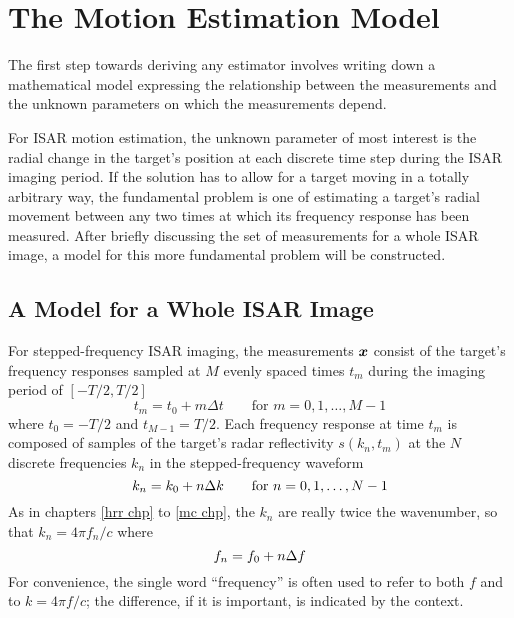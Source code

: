 \section{The Motion Estimation Model}

The first step towards deriving any estimator involves writing down a
mathematical model expressing the relationship between the measurements and 
the unknown parameters on which the measurements depend.  

For ISAR motion estimation, the unknown parameter of most interest is the
radial change in the target's position at each discrete time step during
the ISAR imaging period.  If the solution has to allow for a target moving in a
totally arbitrary way, the fundamental problem is one of estimating a
target's radial movement between any two times at which its frequency 
response has been measured.  After briefly discussing the set of
measurements for a whole ISAR image, a model for this more fundamental
problem will be constructed.

\subsection{A Model for a Whole ISAR Image}

For stepped-frequency ISAR imaging, the measurements $\bm{x}$ consist of the
target's frequency responses sampled at $M$ evenly spaced times $t_m$
during the imaging period of $[-T/2,T/2]$
\begin{equation}
t_m=t_0+m\Delta t\qquad\mbox{for $m=0,1,\ldots,M-1$}
\end{equation}
where $t_0=-T/2$ and $t_{M-1}=T/2$.
Each frequency response at time $t_m$ is composed of samples of the
target's radar reflectivity $s(k_n,t_m)$ at the $N$ discrete frequencies
$k_n$ in the stepped-frequency waveform
\begin{equation}
k_n=k_0+n{\Delta k}\qquad\mbox{for $n=0,1,\ldots,N-1$}
\end{equation}
As in chapters \ref{hrr chp} to \ref{mc chp}, the $k_n$ are really twice the
wavenumber, so that $k_n=4\pi f_n/c$ where 
\begin{equation}\label{ml eqn:f0+ndf}
f_n=f_0+n{\Delta f}
\end{equation}
For convenience, the single word ``frequency'' is often used to refer to
both $f$ and to $k=4\pi f/c$; the difference, if it is important, is
indicated by the context.

